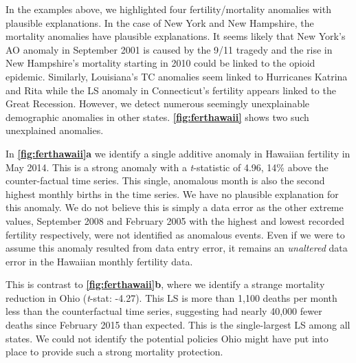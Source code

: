 \documentclass[12pt]{article}
\begin{document}
In the examples above, we highlighted four fertility/mortality anomalies
with plausible explanations. In the case of New York and New Hampshire,
the mortality anomalies have plausible explanations. It seems likely
that New York's AO anomaly in September 2001 is caused by the 9/11
tragedy and the rise in New Hampshire's mortality starting in 2010 could
be linked to the opioid epidemic. Similarly, Louisiana's TC anomalies
seem linked to Hurricanes Katrina and Rita while the LS anomaly in
Connecticut's fertility appears linked to the Great Recession. However,
we detect numerous seemingly unexplainable demographic anomalies in
other states. \textbf{\autoref{fig:ferthawaii}} shows two such
unexplained anomalies.

In \textbf{\autoref{fig:ferthawaii}a} we identify a single additive
anomaly in Hawaiian fertility in May 2014. This is a strong anomaly with
a \emph{t}-statistic of 4.96, 14\% above the counter-factual time
series. This single, anomalous month is also the second highest monthly
births in the time series. We have no plausible explanation for this
anomaly. We do not believe this is simply a data error as the other
extreme values, September 2008 and February 2005 with the highest and
lowest recorded fertility respectively, were not identified as anomalous
events. Even if we were to assume this anomaly resulted from data entry
error, it remains an \emph{unaltered} data error in the Hawaiian monthly
fertility data.

This is contrast to \textbf{\autoref{fig:ferthawaii}b}, where we
identify a strange mortality reduction in Ohio (\emph{t}-stat: -4.27).
This LS is more than 1,100 deaths per month less than the counterfactual
time series, suggesting had nearly 40,000 fewer deaths since February
2015 than expected. This is the single-largest LS among all states. We
could not identify the potential policies Ohio might have put into place
to provide such a strong mortality protection.
\end{document}
